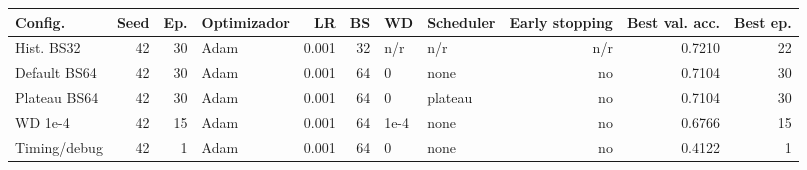 \small
\setlength{\tabcolsep}{3pt}
\begin{tabular}{lrrlrrllrrr}
\hline
Config. & Seed & Ep. & Optimizador & LR & BS & WD & Scheduler & Early stopping & Best val. acc. & Best ep. \\
\hline
Hist. BS32 & 42 & 30 & Adam & 0.001 & 32 & n/r & n/r & n/r & 0.7210 & 22 \\
Default BS64 & 42 & 30 & Adam & 0.001 & 64 & 0 & none & no & 0.7104 & 30 \\
Plateau BS64 & 42 & 30 & Adam & 0.001 & 64 & 0 & plateau & no & 0.7104 & 30 \\
WD 1e-4 & 42 & 15 & Adam & 0.001 & 64 & 1e-4 & none & no & 0.6766 & 15 \\
Timing/debug & 42 & 1 & Adam & 0.001 & 64 & 0 & none & no & 0.4122 & 1 \\
\hline
\end{tabular}
